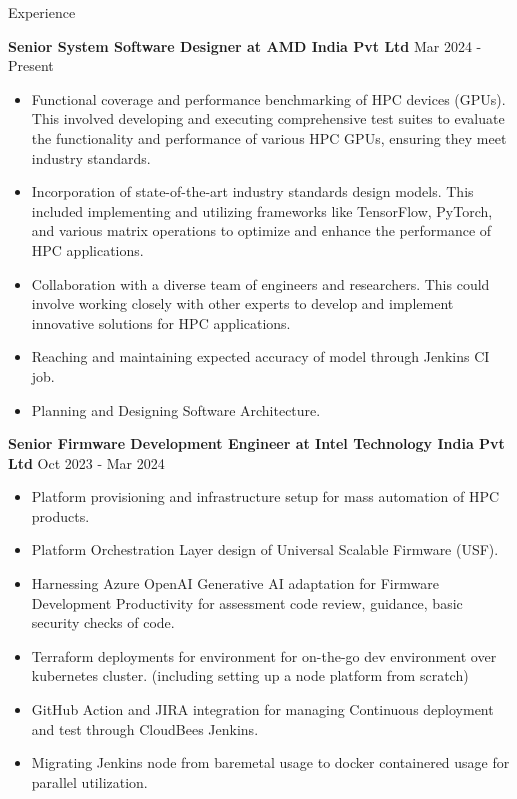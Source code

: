 \documentclass{resume} %
\begin{document}
\begin{rSection}{Experience}

{\bf Senior System Software Designer at AMD India Pvt Ltd} \hfill {Mar 2024 - Present }
\begin{itemize}
    \item Functional coverage and performance benchmarking of HPC devices (GPUs). This involved developing and executing comprehensive test suites to evaluate the functionality and performance of various HPC GPUs, ensuring they meet industry standards.
    \item Incorporation of state-of-the-art industry standards design models. This included implementing and utilizing frameworks like TensorFlow, PyTorch, and various matrix operations to optimize and enhance the performance of HPC applications.
    \item Collaboration with a diverse team of engineers and researchers. This could involve working closely with other experts to develop and implement innovative solutions for HPC applications.
    \item Reaching and maintaining expected accuracy of model through Jenkins CI job.
    \item Planning and Designing Software Architecture.
\end{itemize}

{\textbf{Senior Firmware Development Engineer at Intel Technology India Pvt Ltd}}  \hfill {Oct 2023 - Mar 2024}
\begin{itemize}
    \item Platform provisioning and infrastructure setup for mass automation of HPC products.
    \item Platform Orchestration Layer design of Universal Scalable Firmware (USF).
    \item Harnessing Azure OpenAI Generative AI adaptation for Firmware Development Productivity for assessment code review, guidance, basic security checks of code.
    \item Terraform deployments for environment for on-the-go dev environment over kubernetes cluster. (including setting up a node platform from scratch)
    \item GitHub Action and JIRA integration for managing Continuous deployment and test through CloudBees Jenkins.
    \item Migrating Jenkins node from baremetal usage to docker containered usage for parallel utilization. 
\end{itemize}
 

\end{rSection}
\end{document}
